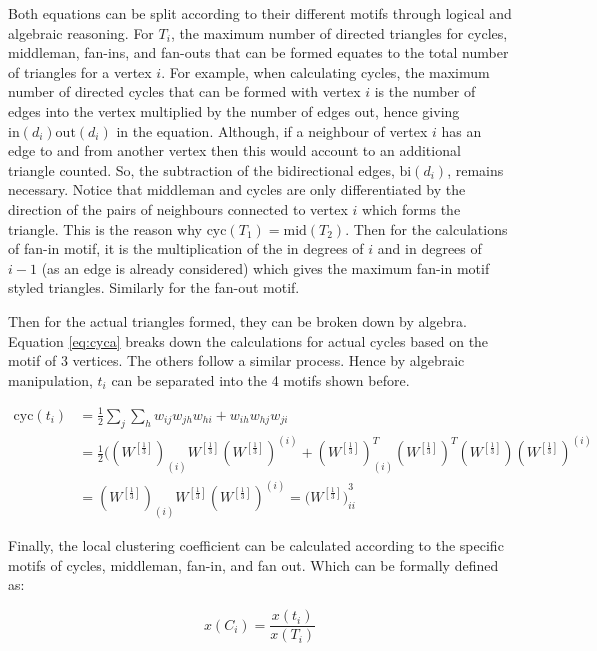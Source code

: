 Both equations can be split according to their different motifs through logical and algebraic reasoning. For $T_i$, the maximum number of directed triangles for cycles, middleman, fan-ins, and fan-outs that can be formed equates to the total number of triangles for a vertex $i$. For example, when calculating cycles, the maximum number of directed cycles that can be formed with vertex $i$ is the number of edges into the vertex multiplied by the number of edges out, hence giving $\text{in}(d_i)\text{out}(d_i)$ in the equation. Although, if a neighbour of vertex $i$ has an edge to and from another vertex then this would account to an additional triangle counted. So, the subtraction of the bidirectional edges,  $\text{bi}(d_i)$, remains necessary. Notice that middleman and cycles are only differentiated by the direction of the pairs of neighbours connected to vertex $i$ which forms the triangle. This is the reason why $\text{cyc}(T_1) = \text{mid}(T_2)$. Then for the calculations of fan-in motif, it is the multiplication of the in degrees of $i$ and in degrees of $i - 1$ (as an edge is already considered) which gives the maximum fan-in motif styled triangles. Similarly for the fan-out motif.

Then for the actual triangles formed, they can be broken down by algebra. Equation \ref{eq:cyca} breaks down the calculations for actual cycles based on the motif of 3 vertices. The others follow a similar process. Hence by algebraic manipulation, $t_i$ can be separated into the 4 motifs shown before.

\begin{align} \label{eq:cyca}
\text{cyc}(t_i) &= \frac{1}{2}\sum_j\sum_h{w_{ij}w_{jh}w_{hi} + w_{ih}w_{hj}w_{ji}} \\
&= \frac{1}{2}((W^{[\frac{1}{3}]})_{(i)}W^{[\frac{1}{3}]}(W^{[\frac{1}{3}]})^{(i)} + (W^{[\frac{1}{3}]})_{(i)}^T(W^{[\frac{1}{3}]})^T(W^{[\frac{1}{3}]})(W^{[\frac{1}{3}]})^{(i)}  \nonumber \\
&= (W^{[\frac{1}{3}]})_{(i)}W^{[\frac{1}{3}]}(W^{[\frac{1}{3}]})^{(i)} = ({W^{[\frac{1}{3}]})}^3_{ii} \nonumber
\end{align}

Finally, the local clustering coefficient can be calculated according to the specific motifs of cycles, middleman, fan-in, and fan out. Which can be formally defined as:

\begin{equation} \label{eq:wdmcc}
x(C_i) = \frac{x(t_i)}{x(T_i)}
\end{equation}

